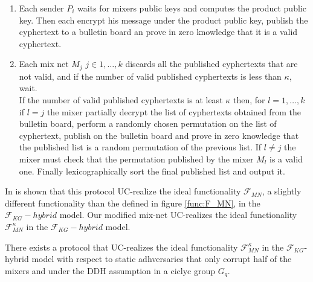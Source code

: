 \documentclass{acm_proc_article-sp}
\begin{document}
\begin{enumerate}

\item Each sender $P_i$ waits for mixers public keys and computes the product public key.
      Then each encrypt his message under the product public key, publish the cyphertext
      to a bulletin board an prove in zero knowledge that it is a valid cyphertext.
\item Each mix net $M_j$ $j\in{1, \ldots, k}$ discards all the published cyphertexts that
      are not valid, and if the number of valid published cyphertexts is less than $\kappa$,
      wait.\\
      If the number of valid published cyphertexts is at least $\kappa$ then, for $l = 1,
      \ldots, k$ if $l = j$ the mixer partially decrypt
      the list of cyphertexts obtained from the bulletin board, perform a randomly chosen
      permutation on the list of cyphertext, publish on the bulletin board and prove in
      zero knowledge that the published list is a random permutation of the previous list.
      If $l \neq j$ the mixer must check that the permutation published by the mixer $M_l$
      is a valid one. Finally lexicographically sort the final published list and output it.

\end{enumerate}


In \cite{Wikstrom04a} is shown that this protocol UC-realize the ideal functionality $\mathcal{F}_{MN}$,
a slightly different functionality than the defined in figure \ref{func:F_MN}, in the
$\mathcal{F}_{KG}-hybrid$ model. Our modified mix-net UC-realizes the ideal functionality
$\mathcal{F}_{MN}^\kappa$ in the $\mathcal{F}_{KG}-hybrid$ model.

\begin{theorem}
There exists a protocol that UC-realizes the ideal functionality $\mathcal{F}_{MN}^\kappa$ in the
$\mathcal{F}_{KG}$-hybrid model with respect to static adhversaries that only corrupt half of
the mixers and under the DDH assumption in a ciclyc group $G_q$.
\label{teo:mixnet}
\end{theorem}
\end{document}

